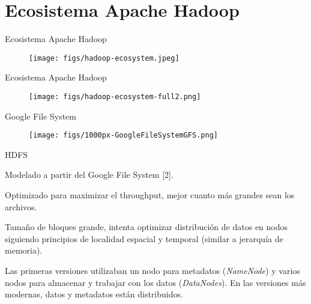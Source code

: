 \section{Ecosistema Apache Hadoop}

\begin{frame}{Ecosistema Apache Hadoop}

\begin{figure}
 \centering
 \texttt{[image: figs/hadoop-ecosystem.jpeg]}
\end{figure}

\end{frame}


\begin{frame}{Ecosistema Apache Hadoop}

\begin{figure}
 \centering
 \texttt{[image: figs/hadoop-ecosystem-full2.png]}
\end{figure}

\end{frame}


\begin{frame}{Google File System}
\begin{figure}
 \centering
 \texttt{[image: figs/1000px-GoogleFileSystemGFS.png]}
\end{figure}

\end{frame}


\begin{frame}{HDFS}
 \begin{wideitemize}
  \item Modelado a partir del Google File System [2].
  \item Optimizado para maximizar el throughput, mejor cuanto más grandes
  sean los archivos.
  \item Tamaño de bloques grande, intenta optimizar distribución de datos
  en nodos siguiendo principios de localidad espacial y temporal (similar
  a jerarquía de memoria).
  \item Las primeras versiones utilizaban un nodo para metadatos (\textit{NameNode})
  y varios nodos para almacenar y trabajar con los datos (\textit{DataNodes}). En las
  versiones más modernas, datos y metadatos están distribuidos.
 \end{wideitemize}

\end{frame}

